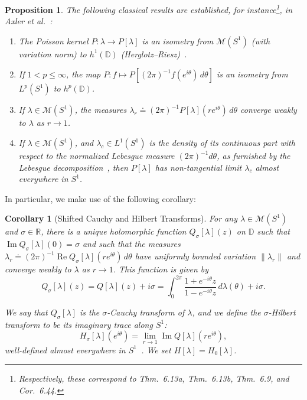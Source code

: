 \documentclass{cams-l} %
\newcommand{\dave}[1]{#1}\newcommand{\davebegin}{}\newcommand{\daveend}{}\newcommand{\george}[1]{#1}
\newcommand{\RR}{\mathbb R}
\newcommand{\DD}{\mathbb D}
\newcommand{\cM}{\mathcal M}
\newcommand{\op}{\operatorname}
\renewcommand{\Re}{\op{Re}}
\renewcommand{\Im}{\op{Im}}
\newtheorem{corollary}[theorem]{Corollary}
\newtheorem{proposition}[theorem]{Proposition}
\theoremstyle{definition}
\theoremstyle{remark}
\numberwithin{equation}{section}
\begin{document}
\begin{proposition}\label{prop:classic}
    The following classical results are established, for instance\footnote{Respectively, these correspond to Thm.~6.13a, Thm.~6.13b, Thm.~6.9, and Cor.~6.44.}, in Axler et al.~\cite{axler2013harmonic}:
    \begin{enumerate}
        \item The Poisson kernel $P:\lambda\to P[\lambda]$ is an isometry from $\cM(S^1)$ (with variation norm) to $h^1(\DD)$ (Herglotz--Riesz)~.\label{prop:classic1}
        \item If $1<p\leq \infty$, the map $P:f\mapsto P[(2\pi)^{-1}f(e^{i\theta})\,d\theta]$ is an isometry from $L^p(S^1)$ to $h^p(\DD)$.\label{prop:classic2}
        \item If $\lambda\in \cM(S^1)$, the measures $\lambda_r\doteq (2\pi)^{-1}P[\lambda](re^{i\theta})\,d\theta$ converge weakly to $\lambda$ as $r\to 1$.\label{prop:classic3}
        \item If $\lambda\in \cM(S^1)$, and $\lambda_c\in L^1(S^1)$ is the density of its continuous part with respect to the normalized Lebesgue measure $(2\pi)^{-1}d\theta$, as furnished by the Lebesgue decomposition~\cite{rudin1974real}, then $P[\lambda]$ has non-tangential limit $\lambda_c$ almost everywhere in $S^1$.\label{prop:classic4}
    \end{enumerate}
\end{proposition}
In particular, we make use of the following corollary:
\begin{corollary}[Shifted Cauchy and Hilbert Transforms]\label{cor:uniqueness}
    For any $\lambda\in\cM(S^1)$ and $\sigma\in\RR$, there is a unique holomorphic function $Q_\sigma[\lambda](z)$ on $\DD$ such that $\Im Q_\sigma[\lambda](0) = \sigma$ and such that the measures $\lambda_r\doteq (2\pi)^{-1}\Re Q_\sigma[\lambda](re^{i\theta})\,d\theta$ \dave{have uniformly bounded variation $\|\lambda_r\|$ and} converge weakly to $\lambda$ as $r\to 1$. This function is given by
    \begin{equation}\label{eq:cauchygeneral}
        Q_\sigma[\lambda](z) = Q[\lambda](z) + i\sigma = \int_{0}^{2\pi}\frac{1+e^{-i\theta}z}{1-e^{-i\theta}z}\,d\lambda(\theta) + i\sigma.
    \end{equation}

    We say that $Q_\sigma[\lambda]$ is the $\sigma$-Cauchy transform of $\lambda$, and we define the $\sigma$-Hilbert transform to be its imaginary trace along $S^1$:
    \begin{equation}\label{eq:H_sigma}
        H_\sigma[\lambda](e^{i\theta}) = \lim_{r\to 1}\Im Q[\lambda](re^{i\theta}),
    \end{equation}
    well-defined almost everywhere in $S^1$~\cite{axler2013harmonic}. We set $H[\lambda] = H_0[\lambda]$.
\end{corollary}
\end{document}
